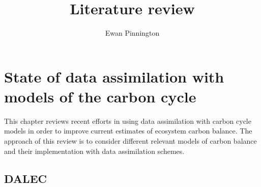 \documentclass[12pt, a4paper]{article}
\title{Literature review}
\author{Ewan Pinnington}
\begin{document}
\maketitle



\section{State of data assimilation with models of the carbon cycle}
This chapter reviews recent efforts in using data assimilation with carbon cycle models in order to improve current estimates of ecosystem carbon balance. The approach of this review is to consider different relevant models of carbon balance and their implementation with data assimilation schemes. 



\subsection{DALEC}
\end{document}

